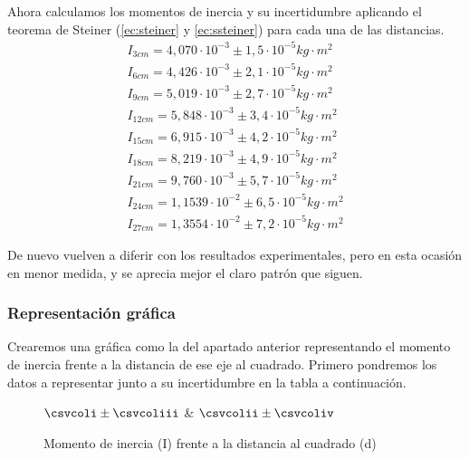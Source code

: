 \documentclass[12pt, a4paper, titlepage]{article}
\begin{document}
  Ahora calculamos los momentos de inercia y su incertidumbre aplicando el teorema de Steiner (\ref{ec:steiner} y \ref{ec:ssteiner}) para cada una de las distancias.
  \begin{gather*}
    I_{3cm} = 4,070 \cdot 10^{-3} \pm 1,5 \cdot 10^{-5} kg \cdot m^2 \\
    I_{6cm} = 4,426 \cdot 10^{-3} \pm 2,1 \cdot 10^{-5} kg \cdot m^2 \\
    I_{9cm} = 5,019 \cdot 10^{-3} \pm 2,7 \cdot 10^{-5} kg \cdot m^2 \\
    I_{12cm} = 5,848 \cdot 10^{-3} \pm 3,4 \cdot 10^{-5} kg \cdot m^2 \\
    I_{15cm} = 6,915 \cdot 10^{-3} \pm 4,2 \cdot 10^{-5} kg \cdot m^2 \\
    I_{18cm} = 8,219 \cdot 10^{-3} \pm 4,9 \cdot 10^{-5} kg \cdot m^2 \\
    I_{21cm} = 9,760 \cdot 10^{-3} \pm 5,7 \cdot 10^{-5} kg \cdot m^2 \\
    I_{24cm} = 1,1539 \cdot 10^{-2} \pm 6,5 \cdot 10^{-5} kg \cdot m^2 \\
    I_{27cm} = 1,3554 \cdot 10^{-2} \pm 7,2 \cdot 10^{-5} kg \cdot m^2
  \end{gather*}

  De nuevo vuelven a diferir con los resultados experimentales, pero en esta ocasión en menor medida, y se aprecia mejor el claro patrón que siguen.

  \subsubsection{Representación gráfica}

  Crearemos una gráfica como la del apartado anterior representando el momento de inercia frente a la distancia de ese eje al cuadrado. Primero pondremos los datos a representar junto a su incertidumbre en la tabla a continuación.

  \begin{figure}[H]
    \begin{table}[H]
      \centering
        {}
        {$\csvcoli \pm \csvcoliii$ & $\csvcolii \pm \csvcoliv$}
    \end{table}
    \caption{Momento de inercia (I) frente a la distancia al cuadrado (d)}
  \end{figure}
\end{document}
